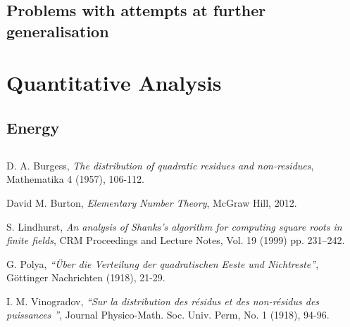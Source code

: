\documentclass{report}
\begin{document}
\section{Problems with attempts at further generalisation}
%
\chapter{Quantitative Analysis}
\section{Energy}
%
%
\section{}
\begin{thebibliography}{9}

 D. A. Burgess,
\textit{The distribution of quadratic residues and non-residues},
Mathematika 4 (1957), 106-112.

David M. Burton, \textit{Elementary Number Theory},
McGraw Hill, 2012.

S. Lindhurst, \textit{An analysis of Shanks's algorithm for computing square roots in finite fields},
CRM Proceedings and Lecture Notes, Vol. 19 (1999) pp. 231–242.

G. Polya,
\textit{``{\"U}ber die Verteilung der quadratischen Eeste und Nichtreste''},
G{\"o}ttinger Nachrichten (1918), 21-29.

I. M. Vinogradov,
\textit{``Sur la distribution des r{\'e}sidus et des non-r{\'e}sidus des puissances ''},
Journal Physico-Math. Soc. Univ. Perm, No. 1 (1918), 94-96.

\end{thebibliography}
%
\end{document}
